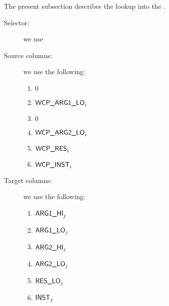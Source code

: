 The present subsection describes the lookup into the \wcpMod{}.
\begin{description}
	\item[Selector:] we use \iomf{}
	\item[Source columns:] we use the following:
		\begin{multicols}{3}
			\begin{enumerate}
				\item $0$
				\item $\textsf{WCP\_ARG1\_LO}   _{i}$
				\item $0$
				\item $\textsf{WCP\_ARG2\_LO}   _{i}$
				\item $\textsf{WCP\_RES}        _{i}$
				\item $\textsf{WCP\_INST}       _{i}$
			\end{enumerate}
		\end{multicols}
	\item[Target columns:] we use the following:
		\begin{multicols}{3}
			\begin{enumerate}
				\item $\textsf{ARG}\textsf{1}\textsf{\_HI}   _{j}$
				\item $\textsf{ARG}\textsf{1}\textsf{\_LO}   _{j}$
				\item $\textsf{ARG}\textsf{2}\textsf{\_HI}   _{j}$
				\item $\textsf{ARG}\textsf{2}\textsf{\_LO}   _{j}$
				\item $\textsf{RES}\textsf{\_LO}      _{j}$
				\item $\textsf{INST}       _{j}$
			\end{enumerate}
		\end{multicols}
\end{description}


